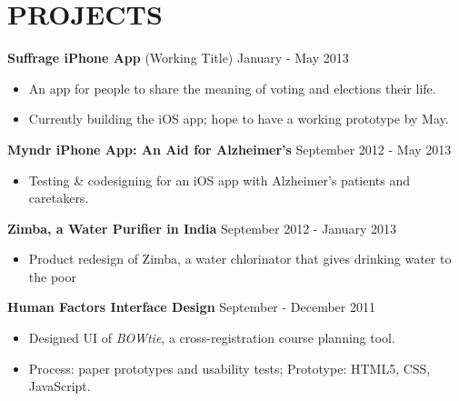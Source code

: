 \documentclass[margin]{res}
\begin{document}
\vspace*{3mm}

\section{PROJECTS \\}


{ \bf Suffrage iPhone App } (Working Title)  \hfill            January - May 2013\ 
	\smallskip
	\begin{itemize}  \itemsep -4pt %
	
	 \item An app for people to share the meaning of voting and elections their life. 
	\item Currently building the iOS app; hope to have a working prototype by May. 
	\end{itemize}

{ \bf Myndr iPhone App: An Aid for Alzheimer's}   \hfill            September 2012 - May 2013\ 
	\smallskip
	\begin{itemize}  \itemsep -4pt %
	
	 \item Testing \& codesigning for an iOS app with Alzheimer's patients and caretakers.  
	\end{itemize}


{ \bf Zimba, a Water Purifier in India}   \hfill            September 2012 - January 2013\ 
	\smallskip
	\begin{itemize}  \itemsep -4pt %
	
	 \item Product redesign of Zimba, a water chlorinator that gives drinking water to the poor
	\end{itemize}

%	


{\bf Human Factors Interface Design} \hfill September - December 2011\
\smallskip
	\begin{itemize}  \itemsep -4pt %
		
	\item Designed UI of {\emph {BOWtie}}, a cross-registration course planning tool.
	\item Process: paper prototypes and usability tests; Prototype: HTML5, CSS, JavaScript. %
	\end{itemize}
\end{document}
